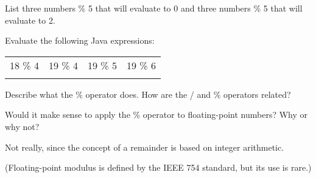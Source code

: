 \begin{answer}
\end{answer}


\Q List three numbers \% 5 that will evaluate to 0 and three numbers \% 5 that will evaluate to 2.

\begin{answer}
\end{answer}


\Q Evaluate the following Java expressions:

\begin{center}
\begin{tabular}{C{1in}C{1in}C{1in}C{1in}}
18 \% 4  &  19 \% 4   &  19 \% 5  &  19 \% 6  \\
\vspace{1ex}
  &     &    &    \\
\end{tabular}
\end{center}


\Q Describe what the \% operator does. How are the / and \% operators related?

\begin{answer}

\end{answer}


\Q Would it make sense to apply the \% operator to floating-point numbers?
Why or why not?

\begin{answer}
Not really, since the concept of a remainder is based on integer arithmetic.

(Floating-point modulus is defined by the IEEE 754 standard, but its use is rare.)
\end{answer}


